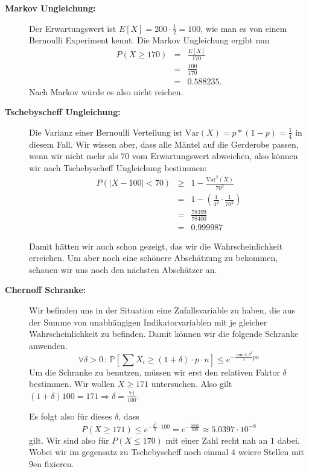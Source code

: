 \documentclass[11pt,a4paper,ngerman]{article}
\newcommand{\Prob}{\mathbb{P}}
\begin{document}
\begin{description}
    \item[\bfseries Markov Ungleichung:] Der Erwartungswert ist $E[X] = 200 \cdot \frac{1}{2} = 100$, wie man es von einem Bernoulli Experiment kennt.
        Die Markov Ungleichung ergibt nun
        \[\begin{array}{rcl}
            P(X \geq 170) &=& \frac{E[X]}{170}\\ &=& \frac{100}{170}\\ &=& 0.588235.
        \end{array}\]
        Nach Markov würde es also nicht reichen.
    \item[\bfseries Tschebyscheff Ungleichung:] Die Varianz einer Bernoulli Verteilung ist $\text{Var}(X) = p*(1-p) = \frac{1}{4}$ in diesem Fall.
        Wir wissen aber, dass alle Mäntel auf die Gerderobe passen, wenn wir nicht mehr als $70$ vom Erwartungswert abweichen, also
        können wir nach Tschebyscheff Ungleichung bestimmen:
        \[\begin{array}{rcl}
            P(|X - 100| < 70) &\geq& 1 - \frac{\text{Var}^2(X)}{70^2}\\
                &=& 1 - \left(\frac{1}{4^2} \cdot \frac{1}{70^2}\right)\\
                &=& \frac{78399}{78400}\\
                &=& 0.999987
        \end{array}\]

        Damit hätten wir auch schon gezeigt, das wir die Wahrscheinlichkeit erreichen. Um aber noch eine schönere Abschätzung zu bekommen, schauen
        wir uns noch den nächsten Abschätzer an.
    \item[\bfseries Chernoff Schranke:] Wir befinden uns in der Situation eine Zufallsvariable zu haben, die aus der Summe von unabhängigen
        Indikatorvariablen mit je gleicher Wahrscheinlichkeit zu befinden. Damit können wir die folgende Schranke anwenden.
        \[
            \forall \delta > 0 \, : \, \Prob \left[\sum X_i \geq (1+\delta)\cdot p \cdot n \right] \leq e^{-\frac{\min{\delta, \delta^2}}{3}pn}
        \]
        Um die Schranke zu benutzen, müssen wir erst den relativen Faktor $\delta$ bestimmen. Wir wollen $X \geq 171$ untersuchen. 
        Also gilt $(1+ \delta) 100 = 171 \Rightarrow \delta = \frac{71}{100}$.

        Es folgt also für dieses $\delta$, dass
        \[
            P(X \geq 171) \leq e^{-\frac{\delta^2}{3}\cdot 100} = e^{-\frac{5041}{300}} \approx 5.0397 \cdot 10^{-8}
        \] 
        gilt. Wir sind also für $P(X \leq 170)$ mit einer Zahl recht nah an $1$ dabei. Wobei wir im gegensatz zu Tschebyscheff noch einmal 4 weiere Stellen
        mit $9$en fixieren.
\end{description}
\end{document}
